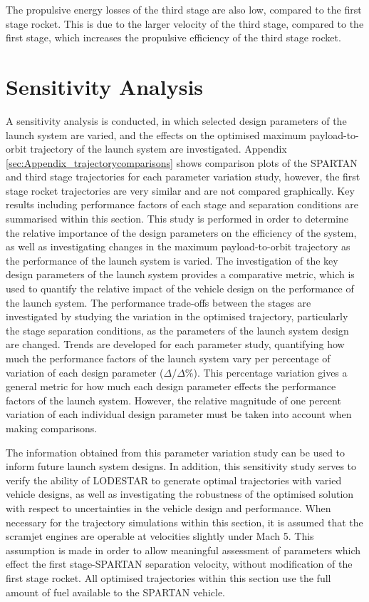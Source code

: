  The propulsive energy losses of the third stage are also low, compared to the first stage rocket. This is due to the larger velocity of the third stage, compared to the first stage, which increases the propulsive efficiency of the third stage rocket.
 


 

  

\section{Sensitivity Analysis}\label{sec:sensitivityNoReturn}


A sensitivity analysis is conducted, in which selected design parameters of the launch system are varied, and the effects on the optimised maximum payload-to-orbit trajectory of the launch system are investigated. Appendix \ref{sec:Appendix_trajectorycomparisons} shows comparison plots of the SPARTAN and third stage trajectories for each parameter variation study, however, the first stage rocket trajectories are very similar and are not compared graphically. Key results including performance factors of each stage and separation conditions are summarised within this section.
This study is performed in order to determine the relative importance of the design parameters on the efficiency of the system, as well as investigating changes in the maximum payload-to-orbit trajectory as the performance of the launch system is varied. The investigation of the key design parameters of the launch system provides a comparative metric, which is used to quantify the relative impact of the vehicle design on the performance of the launch system. The performance trade-offs between the stages are investigated by studying the variation in the optimised trajectory, particularly the stage separation conditions, as the parameters of the launch system design are changed. 
Trends are developed for each parameter study, quantifying how much the performance factors of the launch system vary per percentage of variation of each design parameter ($\Delta$/$\Delta$\%). This percentage variation gives a general metric for how much each design parameter effects the performance factors of the launch system. However, the relative magnitude of one percent variation of each individual design parameter must be taken into account when making comparisons. 

The information obtained from this parameter variation study can be used to inform future launch system designs. 
In addition, this sensitivity study serves to verify the ability of LODESTAR to generate optimal trajectories with varied vehicle designs, as well as investigating the robustness of the optimised solution with respect to uncertainties in the vehicle design and performance.
When necessary for the trajectory simulations within this section, it is assumed that the scramjet engines are operable at velocities slightly under Mach 5. This assumption is made in order to allow meaningful assessment of parameters which effect the first stage-SPARTAN separation velocity, without modification of the first stage rocket.
All optimised trajectories within this section use the full amount of fuel available to the SPARTAN vehicle. 


